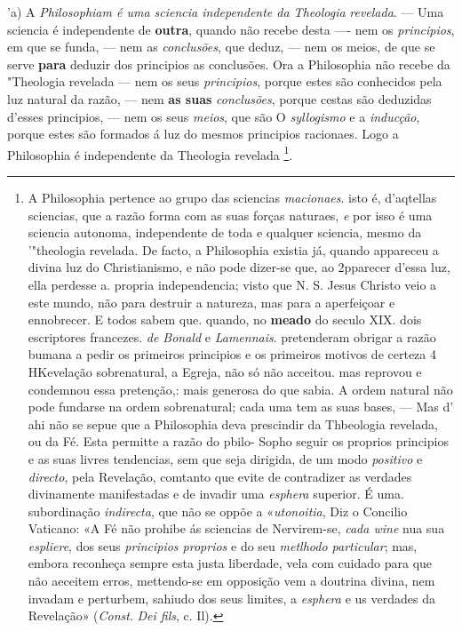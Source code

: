 'a) A \emph{Philosophiam é uma sciencia independente da Theologia} \textbar{} \emph{revelada}. --- Uma sciencia é independente de \textbf{outra}, quando não recebe desta ---- nem os \emph{principios}, em que se funda, --- nem as \emph{conclusões}, que deduz, --- nem os meios, de que se serve \textbf{para} deduzir dos principios as conclusões. Ora a Philosophia não recebe da "Theologia revelada --- nem os seus \emph{principios}, porque estes são conhecidos pela luz natural da razão, --- nem \textbf{as suas} \emph{conclusões}, porque cestas são deduzidas d'esses principios, --- nem os seus \emph{meios}, que são O \emph{syllogismo} e a \emph{inducção}, porque estes são formados á luz do mesmos principios racionaes. Logo a Philosophia é independente da Theologia revelada \footnote{A Philosophia pertence ao grupo das sciencias \emph{macionaes}. isto é, d'aqtellas sciencias, que a razão forma com as suas forças naturaes, \emph{e} por isso é uma sciencia autonoma, independente de toda e qualquer sciencia, mesmo da '"theologia revelada. De facto, a Philosophia existia já, quando appareceu a divina luz do Christianismo, e não pode dizer-se que, ao 2pparecer d'essa luz, ella perdesse a. propria independencia; visto que N. S. Jesus Christo veio a este mundo, não para destruir a natureza, mas para a aperfeiçoar e ennobrecer. E todos sabem que. quando, no \textbf{meado} do seculo XIX. dois escriptores francezes. \emph{de Bonald} e \emph{Lamennais}. pretenderam obrigar a razão bumana a pedir os primeiros principios e os primeiros motivos de certeza 4 HKevelação sobrenatural, a Egreja, não só não acceitou. mas reprovou e condemnou essa pretenção,: mais generosa do que sabia. A ordem natural não pode fundarse na ordem sobrenatural; cada uma tem as suas bases, --- Mas d' ahi não se sepue que a Philosophia deva prescindir da Thbeologia revelada, ou da Fé. Esta permitte a razão do pbilo- Sopho seguir os proprios principios e as suas livres tendencias, sem que seja dirigida, de um modo \emph{positivo} e \emph{directo}, pela Revelação, comtanto que evite de contradizer as verdades divinamente manifestadas e de invadir uma \emph{esphera} superior. É uma. subordinação \emph{indirecta}, que não se oppõe a «\emph{utonoitia}, Diz o Concilio Vaticano: «A Fé não prohibe ás sciencias de Nervirem-se, \emph{cada wine} nua sua \emph{espliere}, dos seus \emph{principios proprios} e do seu \emph{metlhodo particular}; mas, embora reconheça sempre esta justa liberdade, vela com cuidado para que não aeceitem erros, mettendo-se em opposição vem a doutrina divina, nem invadam e perturbem, sahiudo dos seus limites, a \emph{esphera} e us verdades da Revelação» (\emph{Const}. \emph{Dei fils}, c. Il).}.

